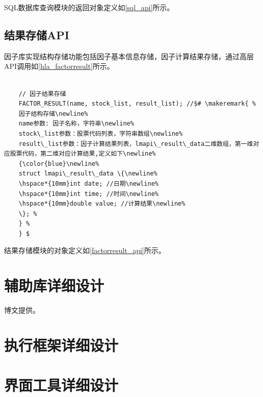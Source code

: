 \highlevelapiend

SQL数据库查询模块的返回对象定义如\ref{sql_api}所示。




\section{结果存储API}
因子库实现结构存储功能包括因子基本信息存储，因子计算结果存储，通过高层API调用如\ref{hla_factorresult}所示。

\begin{lstlisting}[label={hla_factorresult},caption=高层API接口, morekeywords={FACTOR_RESULT}]

    // 因子结果存储
    FACTOR_RESULT(name, stock_list, result_list); //$# \makeremark{ %
    因子结构存储\newline%
    name参数: 因子名称，字符串\newline%
    stock\_list参数：股票代码列表，字符串数组\newline%
    result\_list参数：因子计算结果列表，lmapi\_result\_data二维数组，第一维对应股票代码，第二维对应计算结果,定义如下\newline%
    {\color{blue}\newline%
    struct lmapi\_result\_data \{\newline%
    \hspace*{10mm}int date; //日期\newline%
    \hspace*{10mm}int time; //时间\newline%
    \hspace*{10mm}double value; //计算结果\newline%
    \}; %
    } %
    } $

\end{lstlisting}
\showremarks\hspace*{0mm}

\highlevelapiend

结果存储模块的对象定义如\ref{factorresult_api}所示。




\chapter{辅助库详细设计}

    \LARGE{博文提供}\normalsize。
    \chapter{执行框架详细设计}
    \chapter{界面工具详细设计}

